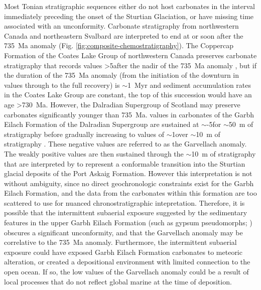 Most Tonian stratigraphic sequences either do not host carbonates in the interval immediately preceding the onset of the Sturtian Glaciation, or have missing time associated with an unconformity. Carbonate stratigraphy from northwestern Canada \citep{Halverson2006a, Macdonald2010a, Rooney2014a} and northeastern Svalbard \citep{Halverson2007a} are interpreted to end at or soon after the 735~Ma anomaly (Fig. \ref{fig:composite-chemostratigraphy}). The Coppercap Formation of the Coates Lake Group of northwestern Canada preserves carbonate stratigraphy that records \dC values \textgreater5\permil after the nadir of the 735~Ma anomaly \citep{Halverson2006a, Rooney2014a}, but if the duration of the 735~Ma anomaly (from the initiation of the downturn in \dC values through to the full recovery) is $\sim$1~Myr \citep{MacLennan2018a} and sediment accumulation rates in the Coates Lake Group are constant, the top of this succession would have an age \textgreater730~Ma. However, the Dalradian Supergroup of Scotland may preserve carbonates significantly younger than 735~Ma. \dC values in carbonates of the Garbh Eilach Formation of the Dalradian Supergroup are sustained at $\sim$-5\permil for $\sim$50~m of stratigraphy before gradually increasing to values of $\sim$1\permil over $\sim$10~m of stratigraphy \citep{Fairchild2018a}. These negative \dC values are referred to as the Garvellach anomaly. The weakly positive values are then sustained through the $\sim$10~m of stratigraphy that are interpreted by \citet{Fairchild2018a} to represent a conformable transition into the Sturtian glacial deposits of the Port Askaig Formation. However this interpretation is not without ambiguity, since no direct geochronologic constraints exist for the Garbh Eilach Formation, and the \SrSr data from the carbonates within this formation \citep{Fairchild2018a} are too scattered to use for nuanced chronostratigraphic intepretation. Therefore, it is possible that the intermittent subaerial exposure suggested by the sedimentary features in the upper Garbh Eilach Formation (such as gypsum pseudomorphs; \citealp{Fairchild2018a}) obscures a significant unconformity, and that the Garvellach anomaly may be correlative to the 735~Ma anomaly. Furthermore, the intermittent subaerial exposure could have exposed Garbh Eilach Formation carbonates to meteoric alteration, or created a depositional environment with limited connection to the open ocean. If so, the low \dC values of the Garvellach anomaly could be a result of local processes that do not reflect global marine \dC at the time of deposition.

